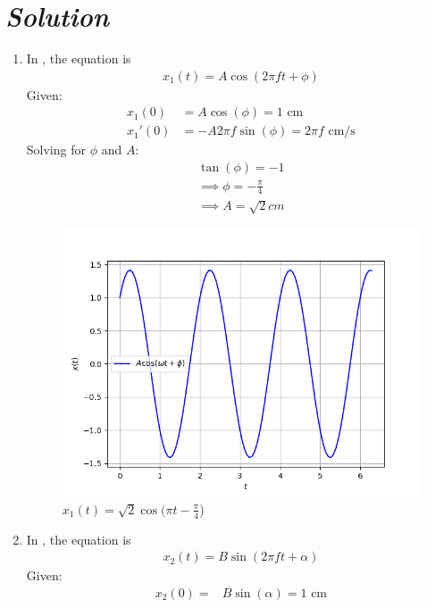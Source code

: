 \documentclass[journal,12pt,twocolumn]{IEEEtran}
\theoremstyle{remark}
\begin{document}
\section*{\textit{\textbf{Solution}}}
\fi

\begin{enumerate}
\item In , the equation is
\begin{align}
   x_1(t) = A \cos(2\pi f t + \phi)  
\end{align}
Given:
\begin{align}
     x_1(0)&= A \cos(\phi) = 1 \text{ cm} \\
 x_1'(0)&= -A 2\pi f \sin(\phi) = 2\pi f \text{ cm/s}
 \end{align}
Solving for $\phi$ and $A$:
\begin{align}
    \tan(\phi) = -1\\
\implies
\phi = -\frac{\pi}{4} \\
\implies 
A= \sqrt{2}cm
\end{align}
\begin{figure}[h]
\renewcommand\thefigure{1}
    \centering
    \includegraphics[width=0.8\columnwidth]{ncert-physics/11/14/7/figs/fig1.png}
    \caption{$x_1(t) = \sqrt{2}\cos(\pi t - \frac{\pi}{4}$)}
    \label{Fig1_11.14.7}
\end{figure}
    \item In , the equation is
\begin{align}
    x_2(t) = B \sin(2\pi f t + \alpha) 
    \end{align}
    Given:\\
    \begin{align}
     x_2(0)=& B \sin(\alpha) = 1 \text{ cm} \\

\end{align}
\end{enumerate}
\end{document}
